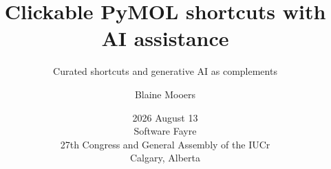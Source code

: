 

\newcommand{\bi}{\begin{itemize}[font=$\bullet$\scshape\bfseries]}
\newcommand{\ei}{\end{itemize}}
\newcommand{\ig}{\includegraphics}
\newcommand{\subt}[1]{{\footnotesize \color{subtitle} {#1}}}

\usepackage{latexsym} %
\newenvironment{checklist}{%
  \begin{list}{}{}%
  \let\olditem\item
  \renewcommand\item{\olditem[$\Box$] }
}{%
  \end{list}
}




\newcommand{\figph}[2][0.72\linewidth]{%
  \setlength{\fboxsep}{0pt}%
  \begin{center}%
  \fcolorbox{gray!60}{gray!12}{%
    \parbox[c][3.4cm][c]{#1}{\centering\itshape\small
      [Figure placeholder]\\[2pt]#2}}%
  \end{center}%
}

\title[PyMOL Shortcuts Manager]{Clickable PyMOL shortcuts with AI assistance}
\subtitle{Curated shortcuts and generative AI as complements}
\author[Mooers]{Blaine Mooers}
\date{2026 August 13 \\ Software Fayre \\ 27th Congress and General Assembly of the IUCr\\ Calgary, Alberta}





